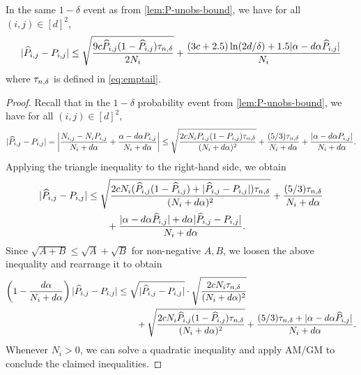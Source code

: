 \begin{lemma}
  \label{lem:P-obs-bound}
  In the same $1-\delta$ event as from \cref{lem:P-unobs-bound},
  we have for all $(i,j) \in [d]^2$,
  \begin{equation*}
    |\widehat{P}_{i,j} - P_{i,j}|
    \leq
    \sqrt{\frac{9c\widehat{P}_{i,j}(1-\widehat{P}_{i,j})\tau_{n,\delta}}{2N_i}}
    + \frac{(3c+2.5)\ln(2d/\delta)+1.5|\alpha-d\alpha\widehat{P}_{i,j}|}{N_i}
  \end{equation*}
  where $\tau_{n,\delta}$ is defined in \cref{eq:emptail}.
\end{lemma}
\begin{proof}
  Recall that in the $1-\delta$ probability event from
  \cref{lem:P-unobs-bound}, we have for all $(i,j) \in [d]^2$,
  \begin{multline*}
    \abs{ \wh{P}_{i,j} - P_{i,j} }
    =
    \Abs{
      \frac{N_{i,j} - N_i P_{i,j}}{N_i + d\alpha}
      + \frac{\alpha - d\alpha P_{i,j}}{N_i + d\alpha}
    } %
    \leq
    \sqrt{\frac{2cN_iP_{i,j}(1-P_{i,j})\emptail}{(N_i+d\alpha)^2}}
    + \frac{(5/3)\emptail}{N_i+d\alpha}
    + \frac{\abs{\alpha-d\alpha P_{i,j}}}{N_i+d\alpha}
    .
  \end{multline*}
  Applying the triangle inequality to the right-hand side, we obtain
  \begin{align}
    | \widehat{P}_{i,j} - P_{i,j} |
    & \leq
    \sqrt{
      \frac{
        2cN_i(
          \widehat{P}_{i,j}(1-\widehat{P}_{i,j})
          + |\widehat{P}_{i,j} - P_{i,j}|
        ) \tau_{n,\delta}
      }{(N_i+d\alpha)^2}
    }
    + \frac{(5/3)\tau_{n,\delta}}{N_i+d\alpha}
    \notag \\
    & \qquad
    + \frac{
      |\alpha-d\alpha \widehat{P}_{i,j}|
      + d\alpha|\widehat{P}_{i,j}-P_{i,j}|
    }{N_i+d\alpha}
    .
    \notag
  \end{align}
  Since $\sqrt{A+B} \leq \sqrt{A} + \sqrt{B}$ for non-negative $A,B$, we
  loosen the above inequality and rearrange it to obtain
  \begin{align*}
    \left( 1 - \frac{d\alpha}{N_i+d\alpha} \right)
    |\widehat{P}_{i,j} - P_{i,j}|
    & \leq
    \sqrt{|\widehat{P}_{i,j} - P_{i,j}|} \cdot
    \sqrt{\frac{2cN_i\tau_{n,\delta}}{(N_i+d\alpha)^2}}
    \\
    & \qquad
    +
    \sqrt{\frac{2cN_i\widehat{P}_{i,j}(1-\widehat{P}_{i,j})\tau_{n,\delta}}{(N_i+d\alpha)^2}}
    + \frac{(5/3)\tau_{n,\delta} + |\alpha -
    d\alpha\widehat{P}_{i,j}|}{N_i+d\alpha}
    .
  \end{align*}
  Whenever $N_i > 0$, we can solve a quadratic inequality and apply
  AM/GM to conclude the claimed inequalities.
\end{proof}

